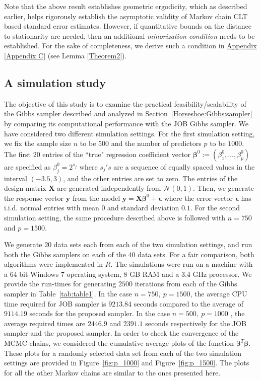 \documentclass[noinfoline,11pt]{imsart}
\numberwithin{equation}{section}
\theoremstyle{plain}
\newcommand{\y}{\mathbf{y}}
\newcommand{\X}{\mathbf{X}}
\begin{document}
\noindent
Note that the above result establishes geometric ergodicity, which as 
described earlier, helps rigorously establish the asymptotic validity of 
Markov chain CLT based standard error estimates. However, if quantitative 
bounds on the distance to stationarity are needed, then an additional 
{\it minorization condition} needs to be established. For the sake of 
completeness, we derive such a condition in \hyperref[Appendix C]{Appendix \ref{Appendix C}} (see Lemma \ref{Theorem2}).

\subsection{A simulation study} \label{simulation:original:Horseshoe}

\noindent
 The objective of this study is to examine the practical feasibility/scalability  of the  Gibbs sampler described and analyzed in Section~\ref{Horseshoe:Gibbs:sampler} by comparing its computational performance with the JOB Gibbs sampler. We have considered two different simulation settings. For the first simulation setting, we fix the sample size $n$ to be $500$ and the number of predictors $p$ to be $1000$. The  first $20$ entries of the ``true" regression coefficient vector  ${\boldsymbol \beta}^0 := (\beta^0_1, \ldots , \beta^0_{p})$ are specified as  $ \beta^0_j=2^{s_j}$ where $s_j's$ are a sequence of equally spaced values in the interval $(-3.5,3)$, and the 
 other entries are set to zero. The entries of the design matrix $\X$ are generated independently from $\mathcal{N}(0,1)$. Then, we generate the response vector ${\y}$ from the model ${\y}= \X {\boldsymbol \beta}^0 + {\boldsymbol \epsilon}$ where the error vector ${\boldsymbol \epsilon}$ has i.i.d. normal entries with mean $0$ and standard deviation $0.1$. For the second simulation setting, the same procedure described 
 above is followed with $n = 750$ and $p = 1500$. 

We generate $20$ data sets each from each of the two simulation settings, and run both the Gibbs samplers on each of the $40$ data sets. For a fair comparison, both algorithms were implemented in $R$. The simulations were run on a machine with a 64 bit Windows 7 operating system, 8 GB RAM and a 
3.4 GHz processor. We provide the run-times for generating $2500$ iterations from each of the Gibbs sampler in Table~\ref{tab:table1}.  In the case $n=750,\  p=1500$,  the average CPU time required for JOB sampler is $ 9213.84 $ seconds compared to the average of $9114.19$ seconds for the proposed  sampler.  In  the case $ n=500,\  p=1000$ ,  the average required times are $2446.9$ and $2391.1$ seconds respectively for the JOB sampler and the proposed sampler. In order to check the convergence of the MCMC chains,  we considered the cumulative average plots of the function $\boldsymbol{\beta}^T\boldsymbol{\beta}$. These plots for a randomly selected data set from each of the two simulation settings are provided in  Figure~\ref{fig:p_1000} and   Figure~\ref{fig:p_1500}.  The plots for all the other Markov chains are similar to the ones presented here. 
\end{document}
